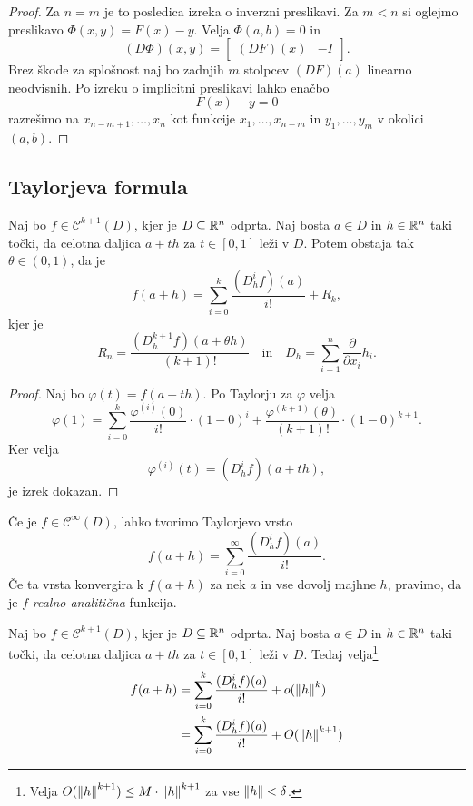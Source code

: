 \begin{proof}
Za $n=m$ je to posledica izreka o inverzni preslikavi. Za $m < n$
si oglejmo preslikavo $\Phi(x,y) = F(x) - y$. Velja $\Phi(a,b)=0$
in
\[
(D\Phi)(x,y) =
\begin{bmatrix}
(DF)(x) & -I
\end{bmatrix}.
\]
Brez škode za splošnost naj bo zadnjih $m$ stolpcev $(DF)(a)$
linearno neodvisnih. Po izreku o implicitni preslikavi lahko enačbo
\[
F(x) - y = 0
\]
razrešimo na $x_{n-m+1},\dots,x_n$ kot funkcije $x_1,\dots,x_{n-m}$
in $y_1,\dots,y_m$ v okolici $(a,b)$.
\end{proof}

\newpage

\subsection{Taylorjeva formula}

\begin{izrek}
Naj bo $f \in \mathcal{C}^{k+1}(D)$, kjer je $D \subseteq \mathbb{R}^n$
odprta. Naj bosta $a \in D$ in $h \in \mathbb{R}^n$ taki točki, da celotna
daljica $a+th$ za $t \in [0,1]$ leži v $D$. Potem obstaja tak
$\theta \in (0,1)$, da je
\[
f(a+h) = \sum_{i=0}^k \frac{(D_h^if)(a)}{i!} + R_k,
\]
kjer je
\[
R_n = \frac{(D_h^{k+1}f)(a + \theta h)}{(k+1)!}
\quad \text{in} \quad
D_h = \sum_{i=1}^n \frac{\partial}{\partial x_i} h_i.
\]
\end{izrek}

\begin{proof}
Naj bo $\varphi(t) = f(a + th)$. Po Taylorju za $\varphi$ velja
\[
\varphi(1) = \sum_{i=0}^k \frac{\varphi^{(i)}(0)}{i!} \cdot(1-0)^i
+ \frac{\varphi^{(k+1)}(\theta)}{(k+1)!} \cdot (1-0)^{k+1}.
\]
Ker velja
\[
\varphi^{(i)}(t) = (D_h^if)(a+th),
\]
je izrek dokazan.
\end{proof}

\begin{opomba}
Če je $f \in \mathcal{C}^\infty(D)$, lahko tvorimo Taylorjevo vrsto
\[
f(a+h) = \sum_{i=0}^\infty \frac{(D_h^if)(a)}{i!}.
\]
Če ta vrsta konvergira k $f(a+h)$ za nek $a$ in vse dovolj majhne
$h$, pravimo, da je $f$ \emph{realno analitična} funkcija.
\end{opomba}

\begin{posledica}
Naj bo $f \in \mathcal{C}^{k+1}(D)$, kjer je $D \subseteq \mathbb{R}^n$
odprta. Naj bosta $a \in D$ in $h \in \mathbb{R}^n$ taki točki, da celotna
daljica $a+th$ za $t \in [0,1]$ leži v $D$. Tedaj velja\footnote{
Velja $O(\left\lVert h\right\rVert^{k+1}) \leq M \cdot \left\lVert h\right\rVert^{k+1}$ za vse
$\left\lVert h\right\rVert < \delta$.}
\begin{align*}
f(a+h) &= \sum_{i=0}^k \frac{(D_h^if)(a)}{i!} + o(\left\lVert h\right\rVert^k)
\\
&= \sum_{i=0}^k \frac{(D_h^if)(a)}{i!} + O(\left\lVert h\right\rVert^{k+1})
\end{align*}
\end{posledica}

